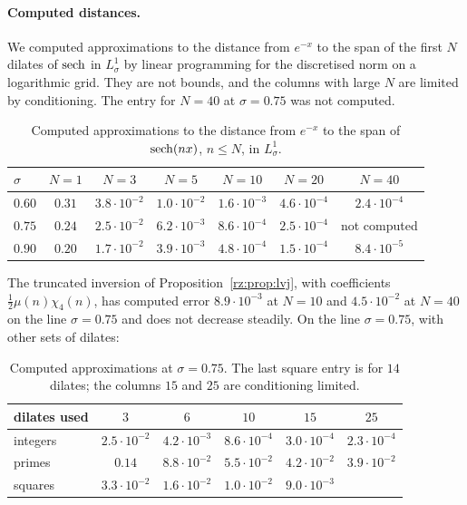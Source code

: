 \paragraph{Computed distances.} We computed approximations to the distance from $e^{-x}$ to the span of the first $N$ dilates of $\operatorname{sech}$ in $L^1_\sigma$ by linear programming for the discretised norm on a logarithmic grid. They are not bounds, and the columns with large $N$ are limited by conditioning. The entry for $N=40$ at $\sigma=0.75$ was not computed.
\begin{table}[ht]
\centering
\small
\setlength{\tabcolsep}{4pt}
\begin{tabular}{lcccccc}
\hline
$\sigma$ & $N=1$ & $N=3$ & $N=5$ & $N=10$ & $N=20$ & $N=40$\\
\hline
$0.60$ & $0.31$ & $3.8\cdot10^{-2}$ & $1.0\cdot10^{-2}$ & $1.6\cdot10^{-3}$ & $4.6\cdot10^{-4}$ & $2.4\cdot10^{-4}$\\
$0.75$ & $0.24$ & $2.5\cdot10^{-2}$ & $6.2\cdot10^{-3}$ & $8.6\cdot10^{-4}$ & $2.5\cdot10^{-4}$ & not computed\\
$0.90$ & $0.20$ & $1.7\cdot10^{-2}$ & $3.9\cdot10^{-3}$ & $4.8\cdot10^{-4}$ & $1.5\cdot10^{-4}$ & $8.4\cdot10^{-5}$\\
\hline
\end{tabular}
\caption{Computed approximations to the distance from $e^{-x}$ to the span of $\operatorname{sech}(nx)$, $n\le N$, in $L^1_\sigma$.}\label{gbm:tab:dist1}
\end{table}
The truncated inversion of Proposition~\ref{rz:prop:lvj}, with coefficients $\frac12\mu(n)\chi_4(n)$, has computed error $8.9\cdot10^{-3}$ at $N=10$ and $4.5\cdot10^{-2}$ at $N=40$ on the line $\sigma=0.75$ and does not decrease steadily. On the line $\sigma=0.75$, with other sets of dilates:
\begin{table}[ht]
\centering
\small
\begin{tabular}{lccccc}
\hline
dilates used & $3$ & $6$ & $10$ & $15$ & $25$\\
\hline
integers & $2.5\cdot10^{-2}$ & $4.2\cdot10^{-3}$ & $8.6\cdot10^{-4}$ & $3.0\cdot10^{-4}$ & $2.3\cdot10^{-4}$\\
primes & $0.14$ & $8.8\cdot10^{-2}$ & $5.5\cdot10^{-2}$ & $4.2\cdot10^{-2}$ & $3.9\cdot10^{-2}$\\
squares & $3.3\cdot10^{-2}$ & $1.6\cdot10^{-2}$ & $1.0\cdot10^{-2}$ & $9.0\cdot10^{-3}$ & \\
\hline
\end{tabular}
\caption{Computed approximations at $\sigma=0.75$. The last square entry is for $14$ dilates; the columns $15$ and $25$ are conditioning limited.}\label{gbm:tab:dist2}
\end{table}
